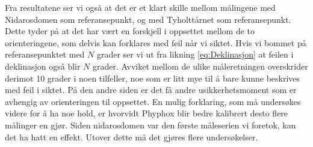 Fra resultatene ser vi også at det er et klart skille mellom målingene med Nidarosdomen som referansepunkt, og med Tyholttårnet som referansepunkt. Dette tyder på at det har vært en forskjell i oppsettet mellom de to orienteringene, som delvis 
kan forklares med feil når vi siktet. Hvis vi bommet på referansepunktet med $N$ grader ser vi ut fra likning 
\eqref{eq:Deklinasjon} at feilen i deklinasjon også blir $N$ grader. Avviket mellom de ulike måleretningen overskrider 
derimot 10 grader i noen tilfeller, noe som er litt mye til å bare kunne beskrives med feil i siktet. På den andre siden er 
det få andre usikkerhetsmoment som er avhengig av orienteringen til oppsettet. En mulig forklaring, som må undersøkes videre 
for å ha noe hold, er hvorvidt Phyphox blir bedre kalibrert desto flere målinger en gjør. Siden nidarosdomen var den første måleserien vi foretok, kan det ha hatt en effekt.
Utover dette må det gjøres flere undersøkelser.
